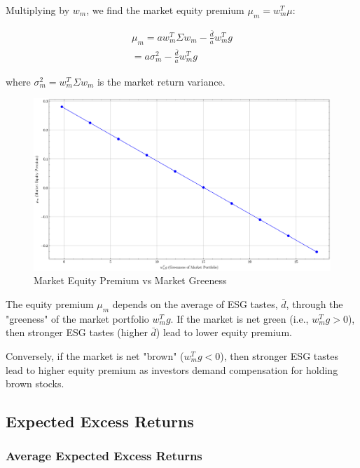 Multiplying by $w_m$, we find the market equity premium $\mu_m = w_m^T \mu$:

\begin{equation}
    \begin{aligned}
    \mu_m = a w_m^T \Sigma w_m - \frac{\bar{d}}{a} w_m^T g  \\
    = a \sigma_m^2 - \frac{\bar{d}}{a} w_m^T g 
    \end{aligned}
\end{equation}

where $\sigma_m^2 = w_m^T \Sigma w_m$ is the market return variance. 

\begin{figure}
    \centering
    \includegraphics[width=1\textwidth]{../images/chapter01/market_equity_premium_vs_greenness.png}
    \caption{Market Equity Premium vs Market Greeness}
    \label{fig:equity_premium}
\end{figure}

The equity premium $\mu_m$ depends on the average of ESG tastes, $\bar{d}$,
through the "greeness" of the market portfolio $w_m^T g$.
If the market is net green (i.e., $w_m^T g > 0$), then stronger 
ESG tastes (higher $\bar{d}$) lead to lower equity premium.

Conversely, if the market is net "brown" ($w_m^T g < 0$), then stronger
ESG tastes lead to higher equity premium as investors demand 
compensation for holding brown stocks.


\subsection{Expected Excess Returns}

\subsubsection{Average Expected Excess Returns}


